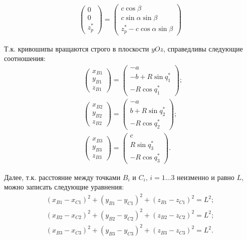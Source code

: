\begin{equation}
\begin{aligned}
		\left(\begin{array}{ccc} 0 \\ 0 \\ z_p^* \end{array}\right) =
		\left(\begin{array}{lr}
				c\cos{\beta} \\
				c\sin{\alpha}\sin{\beta} \\
				z_p^* - c\cos{\alpha}\sin{\beta}\end{array}\right)
	\end{aligned}
\end{equation}

Т.к. кривошипы вращаются строго в плоскости $yOz$, справедливы следующие соотношения:
\begin{equation}
\label{eq:KinematicsCrankPoints}
	\begin{aligned}
		& \left(\begin{array}{lr} x_{B1} \\ y_{B1} \\ z_{B1} \end{array}\right) =
		\left(\begin{array}{lr} -a \\ -b + R\sin{q_1^*} \\ -R\cos{q_1^*} \end{array}\right);\\
		& \left(\begin{array}{lr} x_{B2} \\ y_{B2} \\ z_{B2} \end{array}\right) =
		\left(\begin{array}{lr} -a \\ b + R\sin{q_2^*} \\ -R\cos{q_2^*} \end{array}\right);\\
		& \left(\begin{array}{lr} x_{B3} \\ y_{B3} \\ z_{B3} \end{array}\right) =
		\left(\begin{array}{lr} c \\ R\sin{q_3^*} \\ -R\cos{q_3^*} \end{array}\right).
	\end{aligned}
\end{equation}

Далее, т.к. расстояние между точками $B_i$ и $C_i$, $i=1\ldots3$ неизменно и равно $L$, можно записать следующие уравнения:
\begin{equation}
\label{eq:KinematicsRodLengths}
	\begin{aligned}
		 (x_{B1} - x_{C1})^2 + (y_{B1} - y_{C1})^2 + (z_{B1} - z_{C1})^2 = L^2;\\
		 (x_{B2} - x_{C2})^2 + (y_{B2} - y_{C2})^2 + (z_{B2} - z_{C2})^2 = L^2;\\
		 (x_{B3} - x_{C3})^2 + (y_{B3} - y_{C3})^2 + (z_{B3} - z_{C3})^2 = L^2.
	\end{aligned}
\end{equation}

